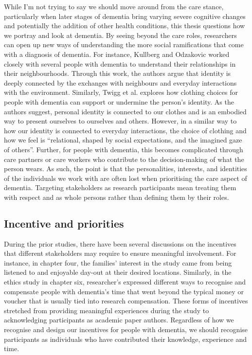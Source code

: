 While I'm not trying to say we should move around from the care stance, particularly when later stages of dementia bring varying severe cognitive changes and potentially the addition of other health conditions, this thesis questions how we portray and look at dementia. By seeing beyond the care roles, researchers can open up new ways of understanding the more social ramifications that come with a diagnosis of dementia. For instance, Kullberg and Odzakovic worked closely with several people with dementia to understand their relationships in their neighbourhoods. Through this work, the authors argue that identity is deeply connected by the exchanges with neighbours and everyday interactions with the environment. Similarly, Twigg et al. explores how clothing choices for people with dementia can support or undermine the person's identity. As the authors suggest, personal identity is connected to our clothes and is an embodied way to present ourselves to ourselves and others. However, in a similar way to how our identity is connected to everyday interactions, the choice of clothing and how we feel is ``relational, shaped by social expectations, and the imagined gaze of others''. Further, for people with dementia, this becomes complicated through care partners or care workers who contribute to the decision-making of what the person wears. As such, the point is that the personalities, interests, and identities of the individuals we work with are often lost when prioritising the care aspect of dementia. Targeting stakeholders as research participants mean treating them with respect and as whole persons rather than defining them by their roles.

\subsection{Incentive and priorities }
\label{incentive}
During the prior studies, there have been several discussions on the incentives that different stakeholders may require to ensure meaningful involvement. For instance, in chapter four, the families' interest in the study came from being listened to and enjoyable day-out at their desired locations. Similarly, in the ethics study in chapter six, researcher's expressed different ways to recognise and compensate people with dementia's time that went beyond the typical money or voucher that is usually tied into research compensation. These forms of incentives stretched from providing meaningful experiences during the study to acknowledging participants as academic paper authors. Regardless of how we recognise and design our incentives for people with dementia, we should recognise participants as individuals who have contributed their knowledge, experience and time.  

